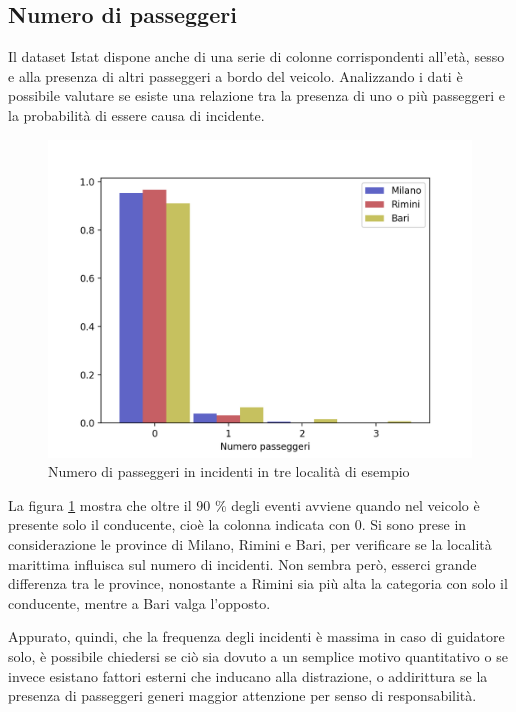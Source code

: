 \documentclass[a4paper]{report}
\begin{document}
\subsection{Numero di passeggeri}

Il dataset Istat dispone anche di una serie di colonne corrispondenti all'età, sesso 
e alla presenza di altri passeggeri a bordo del veicolo.
Analizzando i dati è possibile valutare se esiste una 
relazione tra la presenza di uno o più passeggeri e la probabilità 
di essere causa di incidente.

\begin{figure}
    \includegraphics[width=\linewidth]{../src/incidenti/incidenti_senza_coords/passeggeri/passeggeri.png}
    \caption{Numero di passeggeri in incidenti in tre località di esempio}
    \label{fig:passeggeri-milano-rimini}
\end{figure}

La figura \ref{fig:passeggeri-milano-rimini} mostra che oltre il $90$ \% degli eventi
avviene quando nel veicolo è presente solo il conducente, 
cioè la colonna indicata con 0. 
Si sono prese in considerazione le province di Milano, Rimini e Bari, 
per verificare se la località marittima influisca sul numero di incidenti. 
Non sembra però, esserci grande differenza tra le province, nonostante a Rimini sia 
più alta la categoria con solo il conducente, mentre a Bari valga l'opposto. 

Appurato, quindi, che la frequenza degli incidenti è massima in caso di guidatore solo, 
è possibile chiedersi se ciò sia dovuto a un semplice motivo quantitativo o 
se invece esistano fattori esterni che inducano alla distrazione, o 
addirittura se la presenza di passeggeri generi maggior 
attenzione per senso di responsabilità.
\end{document}
